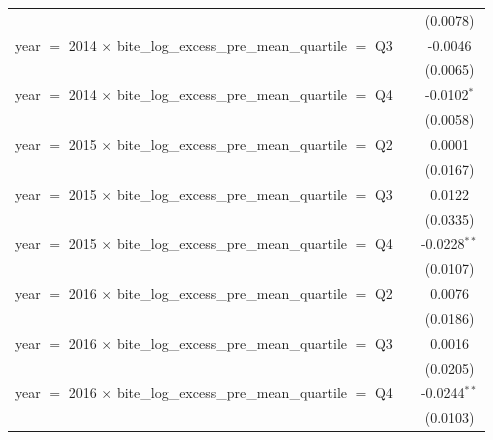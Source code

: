 \begin{tabular}{lcc}
                                                                              &                          & (0.0078)\\   
   year $=$ 2014 $\times$ bite\_log\_excess\_pre\_mean\_quartile $=$ Q3       &                          & -0.0046\\   
                                                                              &                          & (0.0065)\\   
   year $=$ 2014 $\times$ bite\_log\_excess\_pre\_mean\_quartile $=$ Q4       &                          & -0.0102$^{*}$\\   
                                                                              &                          & (0.0058)\\   
   year $=$ 2015 $\times$ bite\_log\_excess\_pre\_mean\_quartile $=$ Q2       &                          & 0.0001\\   
                                                                              &                          & (0.0167)\\   
   year $=$ 2015 $\times$ bite\_log\_excess\_pre\_mean\_quartile $=$ Q3       &                          & 0.0122\\   
                                                                              &                          & (0.0335)\\   
   year $=$ 2015 $\times$ bite\_log\_excess\_pre\_mean\_quartile $=$ Q4       &                          & -0.0228$^{**}$\\   
                                                                              &                          & (0.0107)\\   
   year $=$ 2016 $\times$ bite\_log\_excess\_pre\_mean\_quartile $=$ Q2       &                          & 0.0076\\   
                                                                              &                          & (0.0186)\\   
   year $=$ 2016 $\times$ bite\_log\_excess\_pre\_mean\_quartile $=$ Q3       &                          & 0.0016\\   
                                                                              &                          & (0.0205)\\   
   year $=$ 2016 $\times$ bite\_log\_excess\_pre\_mean\_quartile $=$ Q4       &                          & -0.0244$^{**}$\\   
                                                                              &                          & (0.0103)\\   

\end{tabular}
